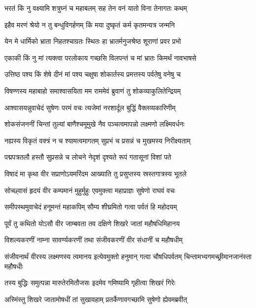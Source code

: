 \twolineshloka
{भरतं किं नु वक्ष्यामि शत्रुघ्नं च महाबलम्}
{सह तेन वनं यातो विना तेनागतः कथम्} %

\twolineshloka
{इहैव मरणं श्रेयो न तु बन्धुविगर्हणम्}
{किं मया दुष्कृतं कर्म कृतमन्यत्र जन्मनि} %

\twolineshloka
{येन मे धार्मिको भ्राता निहतश्चाग्रतः स्थितः}
{हा भ्रातर्मनुजश्रेष्ठ शूराणां प्रवर प्रभो} %

\twolineshloka
{एकाकी किं नु मां त्यक्त्वा परलोकाय गच्छसि}
{विलपन्तं च मां भ्रातः किमर्थं नावभाषसे} %

\twolineshloka
{उत्तिष्ठ पश्य किं शेषे दीनं मां पश्य चक्षुषा}
{शोकार्तस्य प्रमत्तस्य पर्वतेषु वनेषु च} %

\twolineshloka
{विषण्णस्य महाबाहो समाश्वासयिता मम}
{राममेवं ब्रुवाणं तु शोकव्याकुलितेन्द्रियम्} %

\twolineshloka
{आश्वासयन्नुवाचेदं सुषेणः परमं वचः}
{त्यजेमां नरशार्दूल बुद्धिं वैक्लव्यकारिणीम्} %

\twolineshloka
{शोकसंजननीं चिन्तां तुल्यां बाणैश्चमूमुखे}
{नैव पञ्चत्वमापन्नो लक्ष्मणो लक्ष्मिवर्धनः} %

\twolineshloka
{नह्यस्य विकृतं वक्त्रं न च श्यामत्वमागतम्}
{सुप्रभं च प्रसन्नं च मुखमस्य निरीक्ष्यताम्} %

\twolineshloka
{पद्मपत्रतलौ हस्तौ सुप्रसन्ने च लोचने}
{नेदृशं दृश्यते रूपं गतासूनां विशां पते} %

\twolineshloka
{विषादं मा कृथा वीर सप्राणोऽयमरिंदम}
{आख्याति तु प्रसुप्तस्य स्रस्तगात्रस्य भूतले} %

\twolineshloka
{सोच्छ्वासं हृदयं वीर कम्पमानं मुहुर्मुहुः}
{एवमुक्त्वा महाप्राज्ञः सुषेणो राघवं वचः} %

\twolineshloka
{समीपस्थमुवाचेदं हनूमन्तं महाकपिम्}
{सौम्य शीघ्रमितो गत्वा पर्वतं हि महोदयम्} %

\twolineshloka
{पूर्वं तु कथितो योऽसौ वीर जाम्बवता तव}
{दक्षिणे शिखरे जातां महौषधिमिहानय} %

\twolineshloka
{विशल्यकरणीं नाम्ना सावर्ण्यकरणीं तथा}
{संजीवकरणीं वीर संधानीं च महौषधीम्} %

\threelineshloka
{संजीवनार्थं वीरस्य लक्ष्मणस्य त्वमानय}
{इत्येवमुक्तो हनुमान् गत्वा चौषधिपर्वतम्}
{चिन्तामभ्यगमच्छ्रीमानजानंस्ता महौषधीः} %

\twolineshloka
{तस्य बुद्धिः समुत्पन्ना मारुतेरमितौजसः}
{इदमेव गमिष्यामि गृहीत्वा शिखरं गिरेः} %

\twolineshloka
{अस्मिंस्तु शिखरे जातामोषधीं तां सुखावहाम्}
{प्रतर्केणावगच्छामि सुषेणो ह्येवमब्रवीत्} %

